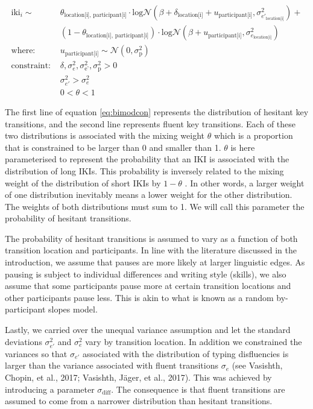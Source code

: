 \documentclass[
  man,floatsintext]{apa7}
\begin{document}
\begin{equation}
\begin{aligned}
\label{eq:bimodcon}
\text{iki}_{i} \sim\text{ } & \theta_\text{location[i], participant[i]} \cdot \text{log}\mathcal{N}(\beta + \delta_\text{location[i]} + u_\text{participant[i]}, \sigma_{e'_\text{location[i]}}^2) + \\
  & (1 - \theta_\text{location[i], participant[i]}) \cdot \text{log}\mathcal{N}(\beta + u_\text{participant[i]}, \sigma_{e_\text{location[i]}}^2)\\
\text{where: } & u_\text{participant[i]} \sim \mathcal{N}(0, \sigma_\text{p}^2) \\
\text{constraint: } & \delta, \sigma_{e}^2, \sigma_\text{e'}^2, \sigma_\text{p}^2>0\\
        & \sigma_{e'}^2 > \sigma_{e}^2\\
        & 0 < \theta < 1
\end{aligned}
\end{equation}

The first line of equation \ref{eq:bimodcon} represents the distribution of hesitant key transitions, and the second line represents fluent key transitions. Each of these two distributions is associated with the mixing weight \(\theta\) which is a proportion that is constrained to be larger than 0 and smaller than 1. \(\theta\) is here parameterised to represent the probability that an IKI is associated with the distribution of long IKIs. This probability is inversely related to the mixing weight of the distribution of short IKIs by \(1-\theta\) . In other words, a larger weight of one distribution inevitably means a lower weight for the other distribution. The weights of both distributions must sum to 1. We will call this parameter the probability of hesitant transitions.

The probability of hesitant transitions is assumed to vary as a function of both transition location and participants. In line with the literature discussed in the introduction, we assume that pauses are more likely at larger linguistic edges. As pausing is subject to individual differences and writing style (skills), we also assume that some participants pause more at certain transition locations and other participants pause less. This is akin to what is known as a random by-participant slopes model.

Lastly, we carried over the unequal variance assumption and let the standard deviations \(\sigma_{e'}^2\) and \(\sigma_{e}^2\) vary by transition location. In addition we constrained the variances so that \(\sigma_{e'}\) associated with the distribution of typing disfluencies is larger than the variance associated with fluent transitions \(\sigma_e\) (see Vasishth, Chopin, et al., 2017; Vasishth, Jäger, et al., 2017). This was achieved by introducing a parameter \(\sigma_\text{diff}\). The consequence is that fluent transitions are assumed to come from a narrower distribution than hesitant transitions.
\end{document}
